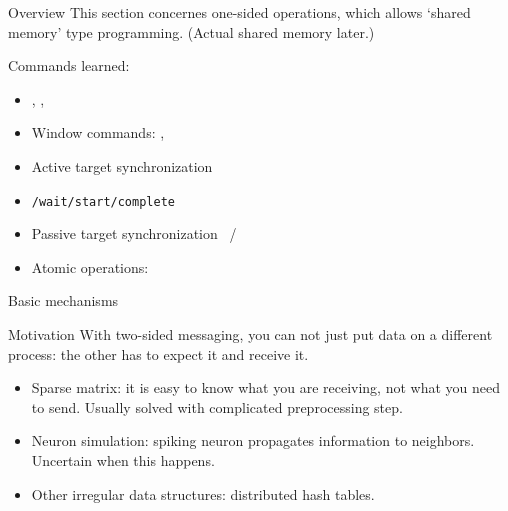
\begin{numberedframe}{Overview}
  This section concernes one-sided operations, which allows `shared
  memory' type programming. (Actual shared memory later.)

  Commands learned:
  \begin{itemize}
  \item {}, , 
  \item Window commands: , 
  \item Active target synchronization 
  \item {}\lstinline{/wait/start/complete}
  \item Passive target synchronization ~/
  \item Atomic operations: 
  \end{itemize}
\end{numberedframe}

 {Basic mechanisms}

\begin{numberedframe}{Motivation}
  With two-sided messaging, you can not just put data
  on a different process: the other has to expect it and receive it.

  \begin{itemize}
  \item Sparse matrix: it is easy to know what you are receiving, not
    what you need to send.  Usually solved with complicated
    preprocessing step.
  \item Neuron simulation: spiking neuron propagates information to neighbors.
    Uncertain when this happens.
  \item Other irregular data structures: distributed hash tables.
  \end{itemize}
\end{numberedframe}

